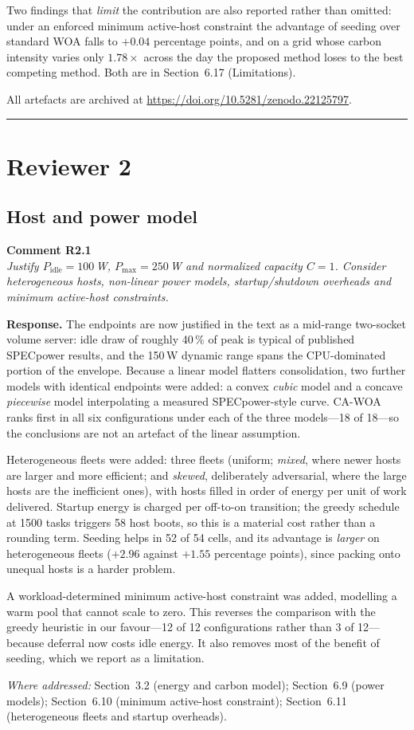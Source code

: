 \documentclass[11pt,a4paper]{article}
\newcommand{\rsp}[1]{\vspace{2pt}\noindent\textbf{Response.} #1\par\vspace{6pt}}
\newcommand{\rwhere}[1]{\noindent\textit{Where addressed:} #1\par\vspace{10pt}}
\newenvironment{revcomment}[1]
  {\begin{tcolorbox}[colback=gray!6,colframe=gray!45,boxrule=0.4pt,
     left=6pt,right=6pt,top=4pt,bottom=4pt]\textbf{#1}\\[2pt]\itshape\color{cmt}}
  {\end{tcolorbox}\vspace{4pt}}
\begin{document}
\noindent Two findings that \emph{limit} the contribution are also reported rather
than omitted: under an enforced minimum active-host constraint the advantage of
seeding over standard WOA falls to $+0.04$ percentage points, and on a grid whose
carbon intensity varies only $1.78\times$ across the day the proposed method loses
to the best competing method. Both are in Section~6.17 (Limitations).

All artefacts are archived at \url{https://doi.org/10.5281/zenodo.22125797}.

\bigskip
\hrule
\bigskip

\section{Reviewer 2}

\subsection*{Host and power model}
\begin{revcomment}{Comment R2.1}
Justify $P_{\text{idle}} = 100$\,W, $P_{\text{max}} = 250$\,W and normalized
capacity $C = 1$. Consider heterogeneous hosts, non-linear power models,
startup/shutdown overheads and minimum active-host constraints.
\end{revcomment}
\rsp{The endpoints are now justified in the text as a mid-range two-socket volume
server: idle draw of roughly 40\,\% of peak is typical of published SPECpower
results, and the 150\,W dynamic range spans the CPU-dominated portion of the
envelope. Because a linear model flatters consolidation, two further models with
identical endpoints were added: a convex \emph{cubic} model and a concave
\emph{piecewise} model interpolating a measured SPECpower-style curve. CA-WOA
ranks first in all six configurations under each of the three models---18 of 18---so
the conclusions are not an artefact of the linear assumption.

Heterogeneous fleets were added: three fleets (uniform; \emph{mixed}, where newer
hosts are larger and more efficient; and \emph{skewed}, deliberately adversarial,
where the large hosts are the inefficient ones), with hosts filled in order of
energy per unit of work delivered. Startup energy is charged per off-to-on
transition; the greedy schedule at 1500 tasks triggers 58 host boots, so this is a
material cost rather than a rounding term. Seeding helps in 52 of 54 cells, and its
advantage is \emph{larger} on heterogeneous fleets ($+2.96$ against $+1.55$
percentage points), since packing onto unequal hosts is a harder problem.

A workload-determined minimum active-host constraint was added, modelling a warm
pool that cannot scale to zero. This reverses the comparison with the greedy
heuristic in our favour---12 of 12 configurations rather than 3 of 12---because
deferral now costs idle energy. It also removes most of the benefit of seeding,
which we report as a limitation.}
\rwhere{Section~3.2 (energy and carbon model); Section~6.9 (power models); Section~6.10
(minimum active-host constraint); Section~6.11 (heterogeneous fleets and startup
overheads).}
\end{document}
